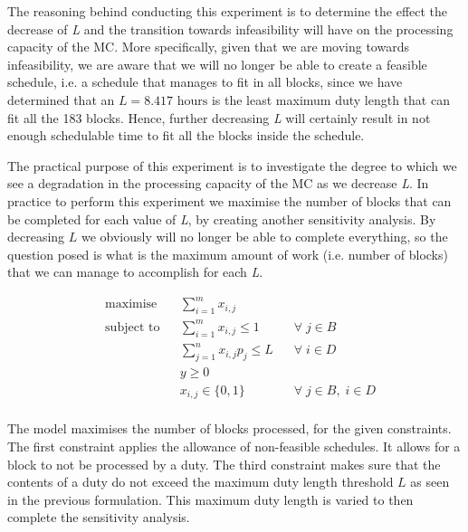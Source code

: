 \vspace{\baselineskip}
\noindent
The reasoning behind conducting this experiment is to determine the effect the decrease of \textit{L} and the transition towards infeasibility will have on the processing capacity of the MC. More specifically, given that we are moving towards infeasibility, we are aware that we will no longer be able to create a feasible schedule, i.e. a schedule that manages to fit in all blocks, since we have determined that an $L=8.417 \text{ hours}$ is the least maximum duty length that can fit all the 183 blocks. Hence, further decreasing \textit{L} will certainly result in not enough schedulable time to fit all the blocks inside the schedule. 

\vspace{\baselineskip}
\noindent
The practical purpose of this experiment is to investigate the degree to which we see a degradation in the processing capacity of the MC as we decrease \textit{L}. In practice to perform this experiment we maximise the number of blocks that can be completed for each value of \textit{L}, by creating another sensitivity analysis. By decreasing $L$ we obviously will no longer be able to complete everything, so the question posed is what is the maximum amount of work (i.e. number of blocks) that we can manage to accomplish for each \textit{L}. 


\vspace{\baselineskip}
\begin{equation}
\label{equation: M3}
\begin{aligned}
&\text{maximise}
& & \sum _{i=1}^m x_{i,j}  \\
& \text{subject to}
& &\sum _{i=1}^m x_{i,j} \leq 1 \;\;\; &\forall \; j \in B\\
& & &\sum _{j=1}^n x_{i,j}p_{j} \leq L \;\;\; &\forall \; i \in D\\
& & & y\geq 0  \\
& & & x_{i,j} \in  \{ 0,1 \} \;\;\; &\forall \; j \in B, \; i \in D\\
\end{aligned}
\end{equation}

\vspace{\baselineskip}
\noindent
The model maximises the number of blocks processed, for the given constraints. The first constraint applies the allowance of non-feasible schedules. It allows for a block to not be processed by a duty. The third constraint makes sure that the contents of a duty do not exceed the maximum duty length threshold $L$ as seen in the previous formulation. This maximum duty length is varied to then complete the sensitivity analysis. 


